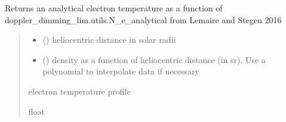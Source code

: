 \documentclass[letterpaper,10pt,english]{sphinxmanual}
\begin{document}
\begin{fulllineitems}
\label{\detokenize{doppler_dimming_lib:doppler_dimming_lib.utils.T_e_analytical}}
\pysigstartsignatures
{}
\pysigstopsignatures
\sphinxAtStartPar
Returns an analytical electron temperature as a function of doppler\_dimming\_lim.utils.N\_e\_analytical from Lemaire and Stegen 2016
\begin{quote}\begin{description}
\begin{itemize}
\item {} 
\sphinxAtStartPar
{} () \textendash{} heliocentric distance in solar radii

\item {} 
\sphinxAtStartPar
{} () \textendash{} density as a function of heliocentric distance (in sr). Use a polynomial to interpolate data if necessary

\end{itemize}

\sphinxAtStartPar
electron temperature profile

\sphinxAtStartPar
float

\end{description}\end{quote}

\end{fulllineitems}


\begin{fulllineitems}
\label{\detokenize{doppler_dimming_lib:doppler_dimming_lib.utils.get_pix_to_rsun}}
\pysigstartsignatures
{}
\pysigstopsignatures
\end{fulllineitems}
\end{document}
